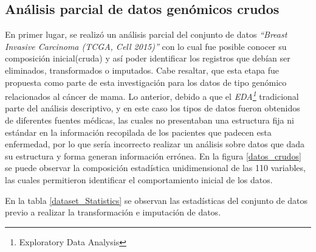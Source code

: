 \newpage
\subsection{Análisis parcial de datos genómicos crudos}
En primer lugar, se realizó un análisis parcial del conjunto de datos \textit{“Breast Invasive Carcinoma (TCGA, Cell 2015)”} con lo cual fue posible conocer su composición inicial(cruda) y así poder identificar los registros que debían ser eliminados, transformados o imputados. Cabe resaltar, que esta etapa fue propuesta como parte de esta investigación para los datos de tipo genómico relacionados al cáncer de mama. Lo anterior, debido a que el \textit{EDA\footnote{Exploratory Data Analysis}} tradicional parte del análisis descriptivo, y en este caso los tipos de datos fueron obtenidos de diferentes fuentes médicas, las cuales no presentaban una estructura fija ni estándar en la información recopilada de los pacientes que padecen esta enfermedad, por lo que sería incorrecto realizar un análisis sobre datos que dada su estructura y forma generan información errónea. En la figura \ref{datos_crudos} se puede observar la composición estadística unidimensional de las 110 variables, las cuales permitieron identificar el comportamiento inicial de los datos.

En la tabla \ref{dataset_Statistics} se observan las estadísticas del conjunto de datos previo a realizar la transformación e imputación de datos. 

